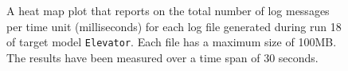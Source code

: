 \begin{figure}[htbp]
\centering
\begin{minipage}{1\textwidth}
  \centering
\end{minipage}
\caption{A heat map plot that reports on the total number of log messages per time unit (milliseconds) for each log file generated during run 18 of target model \texttt{Elevator}. Each file has a maximum size of 100MB. The results have been measured over a time span of 30 seconds.}
\label{figure:throughput_sum_elevator_18}
\end{figure}